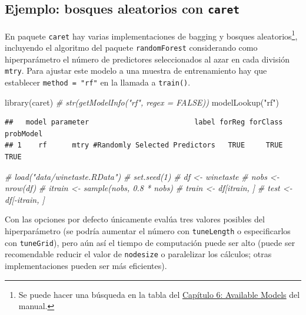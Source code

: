 \documentclass[
  spanish,
]{book}
\newenvironment{Shaded}{\begin{snugshade}}{\end{snugshade}}
\newcommand{\CommentTok}[1]{\textcolor[rgb]{0.56,0.35,0.01}{\textit{#1}}}
\newcommand{\FunctionTok}[1]{\textcolor[rgb]{0.00,0.00,0.00}{#1}}
\newcommand{\NormalTok}[1]{#1}
\newcommand{\StringTok}[1]{\textcolor[rgb]{0.31,0.60,0.02}{#1}}
\theoremstyle{break}
\theoremstyle{definition}
\theoremstyle{definition}
\theoremstyle{definition}
\theoremstyle{definition}
\theoremstyle{remark}
\begin{document}
\hypertarget{ejemplo-bosques-aleatorios-con-caret}{%
\subsection{\texorpdfstring{Ejemplo: bosques aleatorios con \texttt{caret}}{Ejemplo: bosques aleatorios con caret}}\label{ejemplo-bosques-aleatorios-con-caret}}

En paquete \texttt{caret} hay varias implementaciones de bagging y bosques aleatorios\footnote{Se puede hacer una búsqueda en la tabla del \href{https://topepo.github.io/caret/available-models.html}{Capítulo 6: Available Models} del manual.}, incluyendo el algoritmo del paquete \texttt{randomForest} considerando como hiperparámetro el número de predictores seleccionados al azar en cada división \texttt{mtry}.
Para ajustar este modelo a una muestra de entrenamiento hay que establecer \texttt{method\ =\ "rf"} en la llamada a \texttt{train()}.

\begin{Shaded}
\begin{Highlighting}[]
\FunctionTok{library}\NormalTok{(caret)}
\CommentTok{\# str(getModelInfo("rf", regex = FALSE))}
\FunctionTok{modelLookup}\NormalTok{(}\StringTok{"rf"}\NormalTok{)}
\end{Highlighting}
\end{Shaded}

\begin{verbatim}
##   model parameter                         label forReg forClass probModel
## 1    rf      mtry #Randomly Selected Predictors   TRUE     TRUE      TRUE
\end{verbatim}

\begin{Shaded}
\begin{Highlighting}[]
\CommentTok{\# load("data/winetaste.RData")}
\CommentTok{\# set.seed(1)}
\CommentTok{\# df \textless{}{-} winetaste}
\CommentTok{\# nobs \textless{}{-} nrow(df)}
\CommentTok{\# itrain \textless{}{-} sample(nobs, 0.8 * nobs)}
\CommentTok{\# train \textless{}{-} df[itrain, ]}
\CommentTok{\# test \textless{}{-} df[{-}itrain, ]}
\end{Highlighting}
\end{Shaded}

Con las opciones por defecto únicamente evalúa tres valores posibles del hiperparámetro (se podría aumentar el número con \texttt{tuneLength} o especificarlos con \texttt{tuneGrid}), pero aún así el tiempo de computación puede ser alto (puede ser recomendable reducir el valor de \texttt{nodesize} o paralelizar los cálculos; otras implementaciones pueden ser más eficientes).
\end{document}
